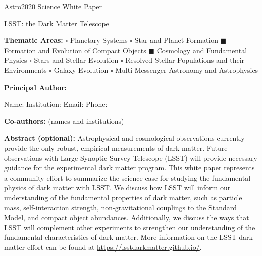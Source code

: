 \documentclass[12pt]{article}
\begin{document}
\raggedright
\huge
Astro2020 Science White Paper \linebreak

LSST: the Dark Matter Telescope\linebreak
\normalsize

\noindent \textbf{Thematic Areas:} \hspace*{60pt} $\square$ Planetary Systems \hspace*{10pt} $\square$ Star and Planet Formation \hspace*{20pt}\linebreak
$\blacksquare$ Formation and Evolution of Compact Objects \hspace*{31pt} $\blacksquare$ Cosmology and Fundamental Physics \linebreak
  $\square$  Stars and Stellar Evolution \hspace*{1pt} $\square$ Resolved Stellar Populations and their Environments \hspace*{40pt} \linebreak
  $\square$    Galaxy Evolution   \hspace*{45pt} $\square$             Multi-Messenger Astronomy and Astrophysics \hspace*{65pt} \linebreak
  
\textbf{Principal Author:}

Name:	
 \linebreak						
Institution:  
 \linebreak
Email: 
 \linebreak
Phone:  
 \linebreak
 
\textbf{Co-authors:} (names and institutions)
  \linebreak

\textbf{Abstract  (optional):}
Astrophysical and cosmological observations currently provide the only robust, empirical measurements of dark matter. Future observations with Large Synoptic Survey Telescope (LSST) will provide necessary guidance for the experimental dark matter program. This white paper represents a community effort to summarize the science case for studying the fundamental physics of dark matter with LSST. We discuss how LSST will inform our understanding of the fundamental properties of dark matter, such as particle mass, self-interaction strength, non-gravitational couplings to the Standard Model, and compact object abundances. Additionally, we discuss the ways that LSST will complement other experiments to strengthen our understanding of the fundamental characteristics of dark matter. More information on the LSST dark matter effort can be found at \href{https://lsstdarkmatter.github.io/}{https://lsstdarkmatter.github.io/}.
\end{document}
